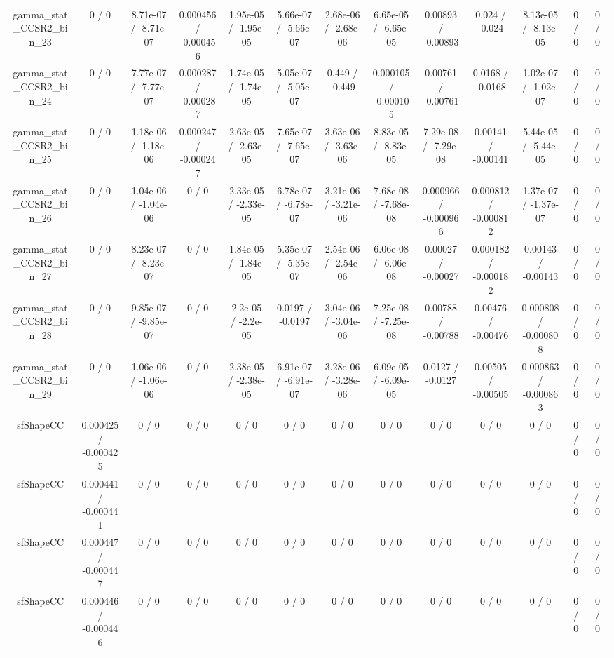 \documentclass[10pt]{article}
\begin{document}
\begin{table}[htbp]
\begin{center}
\begin{tabular}{|c|c|c|c|c|c|c|c|c|c|c|c|c|}
  gamma_stat_CCSR2_bin_23 & 0 / 0 & 8.71e-07 / -8.71e-07 & 0.000456 / -0.000456 & 1.95e-05 / -1.95e-05 & 5.66e-07 / -5.66e-07 & 2.68e-06 / -2.68e-06 & 6.65e-05 / -6.65e-05 & 0.00893 / -0.00893 & 0.024 / -0.024 & 8.13e-05 / -8.13e-05 & 0 / 0 & 0 / 0 \\ 
  gamma_stat_CCSR2_bin_24 & 0 / 0 & 7.77e-07 / -7.77e-07 & 0.000287 / -0.000287 & 1.74e-05 / -1.74e-05 & 5.05e-07 / -5.05e-07 & 0.449 / -0.449 & 0.000105 / -0.000105 & 0.00761 / -0.00761 & 0.0168 / -0.0168 & 1.02e-07 / -1.02e-07 & 0 / 0 & 0 / 0 \\ 
  gamma_stat_CCSR2_bin_25 & 0 / 0 & 1.18e-06 / -1.18e-06 & 0.000247 / -0.000247 & 2.63e-05 / -2.63e-05 & 7.65e-07 / -7.65e-07 & 3.63e-06 / -3.63e-06 & 8.83e-05 / -8.83e-05 & 7.29e-08 / -7.29e-08 & 0.00141 / -0.00141 & 5.44e-05 / -5.44e-05 & 0 / 0 & 0 / 0 \\ 
  gamma_stat_CCSR2_bin_26 & 0 / 0 & 1.04e-06 / -1.04e-06 & 0 / 0 & 2.33e-05 / -2.33e-05 & 6.78e-07 / -6.78e-07 & 3.21e-06 / -3.21e-06 & 7.68e-08 / -7.68e-08 & 0.000966 / -0.000966 & 0.000812 / -0.000812 & 1.37e-07 / -1.37e-07 & 0 / 0 & 0 / 0 \\ 
  gamma_stat_CCSR2_bin_27 & 0 / 0 & 8.23e-07 / -8.23e-07 & 0 / 0 & 1.84e-05 / -1.84e-05 & 5.35e-07 / -5.35e-07 & 2.54e-06 / -2.54e-06 & 6.06e-08 / -6.06e-08 & 0.00027 / -0.00027 & 0.000182 / -0.000182 & 0.00143 / -0.00143 & 0 / 0 & 0 / 0 \\ 
  gamma_stat_CCSR2_bin_28 & 0 / 0 & 9.85e-07 / -9.85e-07 & 0 / 0 & 2.2e-05 / -2.2e-05 & 0.0197 / -0.0197 & 3.04e-06 / -3.04e-06 & 7.25e-08 / -7.25e-08 & 0.00788 / -0.00788 & 0.00476 / -0.00476 & 0.000808 / -0.000808 & 0 / 0 & 0 / 0 \\ 
  gamma_stat_CCSR2_bin_29 & 0 / 0 & 1.06e-06 / -1.06e-06 & 0 / 0 & 2.38e-05 / -2.38e-05 & 6.91e-07 / -6.91e-07 & 3.28e-06 / -3.28e-06 & 6.09e-05 / -6.09e-05 & 0.0127 / -0.0127 & 0.00505 / -0.00505 & 0.000863 / -0.000863 & 0 / 0 & 0 / 0 \\ 
  sfShapeCC & 0.000425 / -0.000425 & 0 / 0 & 0 / 0 & 0 / 0 & 0 / 0 & 0 / 0 & 0 / 0 & 0 / 0 & 0 / 0 & 0 / 0 & 0 / 0 & 0 / 0 \\ 
  sfShapeCC & 0.000441 / -0.000441 & 0 / 0 & 0 / 0 & 0 / 0 & 0 / 0 & 0 / 0 & 0 / 0 & 0 / 0 & 0 / 0 & 0 / 0 & 0 / 0 & 0 / 0 \\ 
  sfShapeCC & 0.000447 / -0.000447 & 0 / 0 & 0 / 0 & 0 / 0 & 0 / 0 & 0 / 0 & 0 / 0 & 0 / 0 & 0 / 0 & 0 / 0 & 0 / 0 & 0 / 0 \\ 
  sfShapeCC & 0.000446 / -0.000446 & 0 / 0 & 0 / 0 & 0 / 0 & 0 / 0 & 0 / 0 & 0 / 0 & 0 / 0 & 0 / 0 & 0 / 0 & 0 / 0 & 0 / 0 \\ 

\end{tabular}
\end{center}
\end{table}
\end{document}
